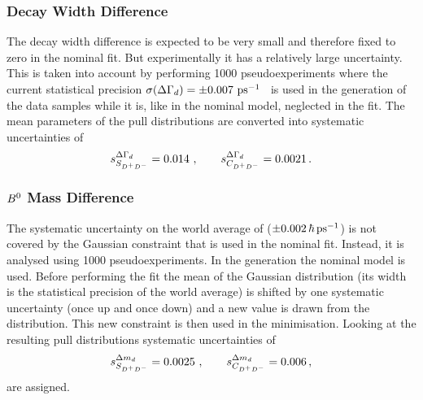 \subsubsection{Decay Width Difference \texorpdfstring{\DGd}{Delta Gamma\_d}}
\label{sec:b02dd:systematics:deltagammad}

The decay width difference \DGd is expected to be very small and therefore
fixed to zero in the nominal fit. But experimentally it has a relatively large
uncertainty. This is taken into account by performing \num{1000}
pseudoexperiments where the current statistical precision $\sigma(\DGd) =
\SI{\pm0.007}{\invps}$~\cite{PDG2014} is used in the generation of the data
samples while it is, like in the nominal model, neglected in the fit. The mean
parameters of the pull distributions are converted into systematic
uncertainties of
\begin{align*}
s_{\SDD}^{\DGd} = \num{0.014}\ , \qquad s_{\CDD}^{\DGd} = \num{0.0021}\,.
\end{align*}

\subsubsection{\texorpdfstring{$\Bz$}{B0} Mass Difference \texorpdfstring{\dmd}{Delta m\_d}}
\label{sec:b02dd:systematics:deltamd}

The systematic uncertainty on the world average of \dmd
($\SI{\pm0.002}{\hbar\invps}$) is not covered by the Gaussian constraint that
is used in the nominal fit. Instead, it is analysed using \num{1000}
pseudoexperiments. In the generation the nominal model is used. Before
performing the fit the mean of the Gaussian distribution (its width is the
statistical precision of the world average) is shifted by one systematic
uncertainty (once up and once down) and a new value is drawn from the
distribution. This new constraint is then used in the minimisation. Looking at
the resulting pull distributions systematic uncertainties of
\begin{align*}
s_{\SDD}^{\dmd} = \num{0.0025}\ , \qquad s_{\CDD}^{\dmd} = \num{0.006}\,,
\end{align*}
are assigned.
